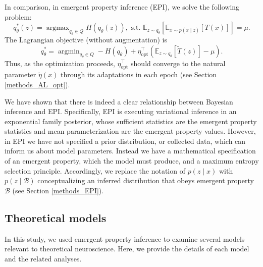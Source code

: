 \documentclass[11pt]{article}
\DeclareMathOperator*{\argmin}{argmin}
\DeclareMathOperator*{\argmax}{argmax}
\begin{document}
In comparison, in emergent property inference (EPI), we solve the following problem:
\begin{equation}
q_\theta^*(z) = \argmax_{q_\theta \in Q} H(q_\theta(z)),   \text{  s.t.  } \mathbb{E}_{z \sim q_\theta}\left[ \mathbb{E}_{x\sim p(x \mid z)}\left[T(x)\right] \right] = \mu.
\end{equation}
The Lagrangian objective (without augmentation) is
\begin{equation}
q_\theta^* = \argmin_{q_\theta \in Q} - H(q_\theta) + \eta_{\text{opt}}^\top \left(\mathbb{E}_{z \sim q_\theta} \left[\tilde{T}(z) \right] - \mu \right).
\end{equation}
Thus, as the optimization proceeds, $\eta_{\text{opt}}^\top$ should converge to the natural parameter $\tilde{\eta}(x)$ through its adaptations in each epoch (see Section \ref{methods_AL_opt}). 

We have shown that there is indeed a clear relationship between Bayesian inference and EPI.
Specifically, EPI is executing variational inference in an exponential family posterior,  whose sufficient statistics are the emergent property statistics and mean parameterization are the emergent property values.
However, in EPI we  have not specified a prior distribution, or collected data, which can inform us about model parameters.
Instead we have a mathematical specification of an emergent property, which the model must produce, and a maximum entropy selection principle.
Accordingly, we replace the notation of $p(z \mid x)$ with $p(z \mid \mathcal{B})$ conceptualizing an inferred distribution that obeys emergent property $\mathcal{B}$ (see Section \ref{methods_EPI}). 

\subsection{Theoretical models}\label{methods_theoretical_models}
In this study, we used emergent property inference to examine several models relevant to theoretical neuroscience.  Here, we provide the details of each model  and the related analyses.
\end{document}
